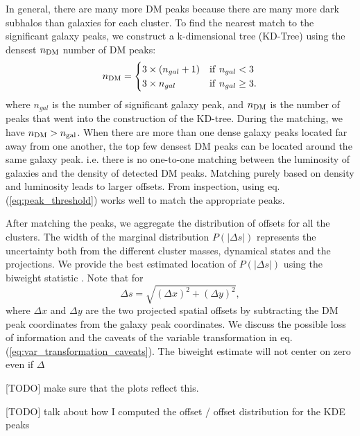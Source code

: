 In general, there are many more DM peaks because there are many more dark 
subhalos than galaxies for each cluster.  
To find the nearest match to the significant galaxy peaks,  
we construct a k-dimensional tree (KD-Tree) using the densest $n_{\rm DM}$ number of DM
peaks:
\begin{equation}
	n_{\rm DM} = \begin{cases}		
		3 \times (n_{gal} + 1) & {\rm if~} n_{gal} < 3 \\
	3 \times n_{gal}  & {\rm if~} n_{gal} \geq 3.
	\end{cases}
	\label{eq:peak_threshold}
\end{equation}
where $n_{gal}$ is the number of significant galaxy peak, and $n_{\rm DM}$
is the number of peaks that went into the construction of the KD-tree.
During the matching, we have $n_{\rm DM} > n_{\rm gal}$. When there are more
than one dense galaxy peaks located far away from one another, 
the top few densest DM peaks can be located around the same galaxy peak. 
i.e. there is no one-to-one matching between the luminosity of galaxies and the
density of detected DM peaks.
Matching purely based on density and luminosity leads to larger offsets.
From inspection, using eq. (\ref{eq:peak_threshold}) works well to match the appropriate
peaks. 

After matching the peaks, we aggregate the distribution of offsets for all the
clusters. The width of the marginal distribution 
$P(|\Delta s|)$ 
represents the uncertainty both from the different cluster masses, dynamical states
and the projections.
We provide the best estimated location of $P(|\Delta s|)$ using the biweight 
statistic \citep{Beers90}. 
Note that for 
\begin{equation}
	\Delta s = \sqrt{(\Delta x)^2 + (\Delta y)^2},
	\label{eq:var_transformation_caveats}
\end{equation}
where $\Delta x$ and $\Delta y$ are the two projected spatial offsets by
subtracting the DM peak coordinates from the galaxy peak coordinates.
We discuss the possible loss of information and the caveats of 
the variable transformation in eq. 
(\ref{eq:var_transformation_caveats}).
The biweight estimate will not center on zero even if $\Delta $





[TODO] make sure that the plots reflect this.

[TODO] talk about how I computed the offset / offset distribution for the KDE
peaks 

